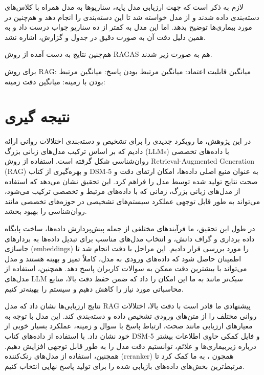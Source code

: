 \documentclass{CCI2020}
\begin{document}
لازم به ذکر است که جهت ارزیابی مدل پایه، سناریوها به مدل  همراه با کلاس‌های دسته‌بندی داده شدند و از مدل خواسته شد تا این دسته‌بندی را انجام دهد و هم‌چنین در مورد بیماری‌ها توضیح بدهد. اما این مدل به کمتر از ده سناریو جواب درست داد و به همین دلیل دقت آن به صورت دقیق در جدول و گزارش، اشاره نشد.

هم‌چنین نتایج به دست آمده از روش RAGAS هم به صورت زیر شدند.

برای روش RAG: \newline
میانگین قابلیت اعتماد:  \newline
میانگین مرتبط بودن پاسخ:  \newline
میانگین مرتبط بودن با زمینه:  \newline
میانگین دقت زمینه:  \newline

\section{نتیجه گیری}
در این پژوهش، ما رویکرد جدیدی را برای تشخیص و دسته‌بندی اختلالات روانی ارائه دادیم که بر اساس ترکیب مدل‌های زبانی بزرگ (LLMs) با داده‌های تخصصی روان‌شناسی شکل گرفته است. استفاده از روش Retrieval-Augmented Generation (RAG) و بهره‌گیری از کتاب DSM-5 به عنوان منبع اصلی داده‌ها، امکان ارتقای دقت و صحت نتایج تولید شده توسط مدل را فراهم کرد. این تحقیق نشان می‌دهد که استفاده از مدل‌های زبانی بزرگ، زمانی که با داده‌های مرتبط و تخصصی ترکیب می‌شود، می‌تواند به طور قابل توجهی عملکرد سیستم‌های تشخیصی در حوزه‌های تخصصی مانند روان‌شناسی را بهبود بخشد.

در طول این تحقیق، ما فرآیندهای مختلفی از جمله پیش‌پردازش داده‌ها، ساخت پایگاه داده برداری و گراف دانش، و انتخاب مدل‌های مناسب برای تبدیل داده‌ها به بردارهای جاسازی (embeddings) را مورد بررسی قرار دادیم. این مراحل با دقت انجام شد تا اطمینان حاصل شود که داده‌های ورودی به مدل، کاملاً تمیز و بهینه هستند و مدل می‌تواند با بیشترین دقت ممکن به سوالات کاربران پاسخ دهد. همچنین، استفاده از مدل‌های LLM سبک‌تر مانند  به ما این امکان را داد که ضمن حفظ دقت بالا، منابع محاسباتی مورد نیاز را کاهش دهیم و سیستم را بهینه‌تر کنیم.

نتایج ارزیابی‌ها نشان داد که مدل RAG پیشنهادی ما قادر است با دقت بالا، اختلالات روانی مختلف را از متن‌های ورودی تشخیص داده و دسته‌بندی کند. این مدل با توجه به معیارهای ارزیابی مانند صحت، ارتباط پاسخ با سوال و زمینه، عملکرد بسیار خوبی از خود نشان داد. با استفاده از داده‌های کتاب DSM-5 و فایل کمکی حاوی اطلاعات بیشتر درباره زیربیماری‌ها و علائم، توانستیم دقت مدل را به طور قابل توجهی افزایش دهیم. همچنین، استفاده از مدل‌های رنک‌کننده (reranker) همچون ، به ما کمک کرد تا مرتبط‌ترین بخش‌های داده‌های بازیابی شده را برای تولید پاسخ نهایی انتخاب کنیم.
\end{document}
